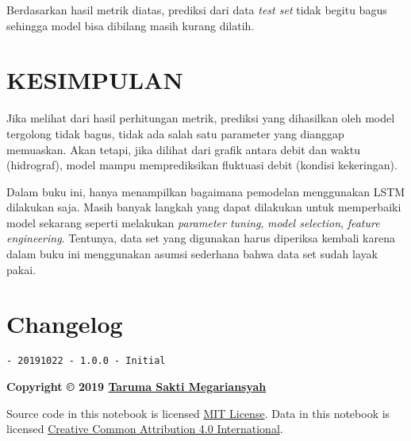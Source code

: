 \documentclass[11pt]{article}
\begin{document}
    Berdasarkan hasil metrik diatas, prediksi dari data \emph{test set}
tidak begitu bagus sehingga model bisa dibilang masih kurang dilatih.

    \hypertarget{kesimpulan}{%
\section{KESIMPULAN}\label{kesimpulan}}

    Jika melihat dari hasil perhitungan metrik, prediksi yang dihasilkan
oleh model tergolong tidak bagus, tidak ada salah satu parameter yang
dianggap memuaskan. Akan tetapi, jika dilihat dari grafik antara debit
dan waktu (hidrograf), model mampu memprediksikan fluktuasi debit
(kondisi kekeringan).

Dalam buku ini, hanya menampilkan bagaimana pemodelan menggunakan LSTM
dilakukan saja. Masih banyak langkah yang dapat dilakukan untuk
memperbaiki model sekarang seperti melakukan \emph{parameter tuning},
\emph{model selection}, \emph{feature engineering}. Tentunya, data set
yang digunakan harus diperiksa kembali karena dalam buku ini menggunakan
asumsi sederhana bahwa data set sudah layak pakai.

    \hypertarget{changelog}{%
\section{Changelog}\label{changelog}}

\begin{verbatim}
- 20191022 - 1.0.0 - Initial
\end{verbatim}

\textbf{Copyright © 2019 \href{https://taruma.github.io}{Taruma Sakti
Megariansyah}}

Source code in this notebook is licensed
\href{https://github.com/taruma/vivaldi/blob/master/LICENSE}{MIT
License}. Data in this notebook is licensed
\href{https://creativecommons.org/licenses/by/4.0/}{Creative Common
Attribution 4.0 International}.


    
    
    
\end{document}
